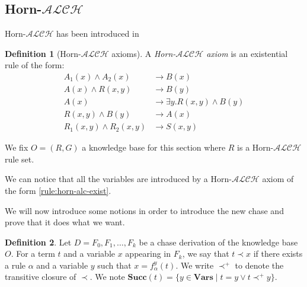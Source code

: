 \documentclass{article}
\theoremstyle{definition}
\newtheorem{definition}{Definition}[section]
\theoremstyle{remark}
\newcommand{\Vars}{\textbf{Vars}}
\newcommand{\su}{\textbf{Succ}}
\begin{document}
\subsection{Horn-$\mathcal{ALCH}$ }

Horn-$\mathcal{ALCH}$ has been introduced in \cite{Horn-ALC}

\begin{definition}[Horn-$\mathcal{ALCH}$ axioms]
A \emph{Horn-$\mathcal{ALCH}$ axiom} is an existential rule of the form:
\begin{align}
A_1(x) \wedge A_2(x) &\rightarrow B(x) \\
A(x) \wedge R(x,y) &\rightarrow B(y) \\
A(x) &\rightarrow \exists y.R(x,y) \wedge B(y) \label{rule:horn-alc-exist} \\
R(x,y) \wedge B(y) &\rightarrow A(x) \\
R_1(x,y) \wedge R_2(x,y) &\rightarrow S(x,y)
\end{align}

\end{definition}


We fix $O=(R,G)$ a knowledge base for this section where $R$ is a Horn-$\mathcal{ALCH}$ rule set.

We can notice that all the variables are introduced by a Horn-$\mathcal{ALCH}$ axiom of the form \ref{rule:horn-alc-exist}.

We will now introduce some notions in order to introduce the new chase and prove that it does what we want.

\begin{definition}
Let $D = F_0,F_1,\ldots,F_k$ be a chase derivation of the knowledge base $O$. For a term $t$ and a variable $x$ appearing in $F_k$, we say that $t \prec x$ if there exists a rule $\alpha$ and a variable $y$ such that $x= f_\alpha^y(t)$.
We write $\prec^+$ to denote the transitive closure of $\prec$. We note \emph{$\su(t)$}$= \{y \in \Vars \mid t = y \vee t \prec^+ y\}$.
\end{definition}
\end{document}
